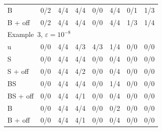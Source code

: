 \begin{table}[!htbp]
\begin{tabular}{l rrrrrrr}
B & 0/2 & 4/4 & 4/4 & 0/0 & 4/4 & 0/1 & 1/3 \\
B + off & 0/2 & 4/4 & 4/4 & 0/0 & 4/4 & 1/3 & 1/4 \\
\midrule
\multicolumn{8}{l}{Example~3, $\varepsilon=10^{-8}$}\\
u & 0/0 & 4/4 & 4/3 & 4/3 & 1/4 & 0/0 & 0/0 \\
S & 0/0 & 4/4 & 4/4 & 0/0 & 0/4 & 0/0 & 0/0 \\
S + off & 0/0 & 4/4 & 4/2 & 0/0 & 0/4 & 0/0 & 0/0 \\
BS & 0/0 & 4/4 & 4/4 & 0/0 & 1/4 & 0/0 & 0/0 \\
BS + off & 0/0 & 4/4 & 4/1 & 0/0 & 0/4 & 0/0 & 0/0 \\
B & 0/0 & 4/4 & 4/4 & 0/0 & 0/2 & 0/0 & 0/0 \\
B + off & 0/0 & 4/4 & 4/1 & 0/0 & 0/4 & 0/0 & 0/0 \\
\bottomrule
\end{tabular}
\end{table}
